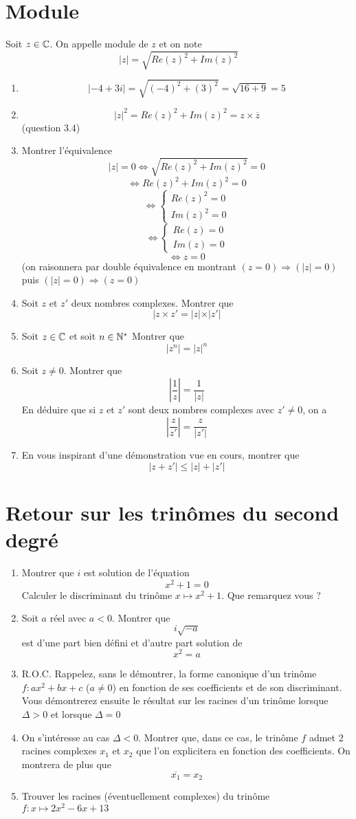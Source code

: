 \section{Module}
Soit $z\in\mathbb{C}$. On appelle module de $z$ et on note $$|z| = \sqrt{Re(z)^2 + Im(z)^2}$$
\begin{enumerate}
\item $$|-4+3i| = \sqrt{(-4)^2 + (3)^2} = \sqrt{16+9} = 5$$
\item 
$$|z|^2 = Re(z)^2 + Im(z)^2 = z \times \overline{z}$$
(question 3.4)
\item Montrer l'équivalence 
$$|z| = 0 \Leftrightarrow \sqrt{Re(z)^2+Im(z)^2} = 0$$
$$\Leftrightarrow Re(z)^2 + Im(z)^2 = 0$$
$$\Leftrightarrow \left\{\begin{array}{l}Re(z)^2 = 0 \\ Im(z)^2 = 0 \end{array}\right.$$
$$\Leftrightarrow \left\{\begin{array}{l}Re(z) = 0 \\ Im(z) = 0 \end{array}\right.$$
$$\Leftrightarrow z = 0$$
(on raisonnera par double équivalence en montrant $(z = 0) \Rightarrow (|z| = 0)$ puis $(|z| = 0) \Rightarrow (z = 0)$
\item Soit $z$ et $z'$ deux nombres complexes. Montrer que $$|z\times z' = |z|\times |z'|$$
\item Soit $z\in\mathbb{C}$ et soit $n\in \mathbb{N}^*$ Montrer que 
$$|z^n| = |z|^n$$
\item Soit $z \neq 0$. Montrer que 
$$\left|\frac{1}{z}\right| = \frac{1}{|z|}$$
En déduire que si $z$ et $z'$ sont deux nombres complexes avec $z'\neq 0$, on a 
$$\left|\frac{z}{z'}\right| = \frac{z}{|z'|}$$
\item En vous inspirant d'une démonstration vue en cours, montrer que 
$$|z+z'| \leq |z| + |z'|$$
\end{enumerate}
\section{Retour sur les trinômes du second degré}
\begin{enumerate}
\item Montrer que $i$ est solution de l'équation 
$$x^2+1 = 0$$
Calculer le discriminant du trinôme $x\mapsto x^2 +1$. Que remarquez vous ?
\item Soit $a$ réel avec $a<0$. Montrer que 
$$i\sqrt{-a}$$
est d'une part bien défini et d'autre part solution de 
$$x^2 = a$$
\item R.O.C. Rappelez, sans le démontrer, la forme canonique d'un trinôme $f:ax^2+bx+c$ ($a\neq0$) en fonction de ses coefficients et de son discriminant. Vous démontrerez ensuite le résultat sur les racines d'un trinôme lorsque $\Delta > 0$ et lorsque $\Delta = 0$
\item On s'intéresse au cas $\Delta < 0$. Montrer que, dans ce cas, le trinôme $f$ admet 2 racines complexes $x_1$ et $x_2$ que l'on explicitera en fonction des coefficients. On montrera de plus que $$\overline{x_1} = x_2$$
\item Trouver les racines (éventuellement complexes) du trinôme $f:x\mapsto 2x^2 -6x +13$
\end{enumerate}
